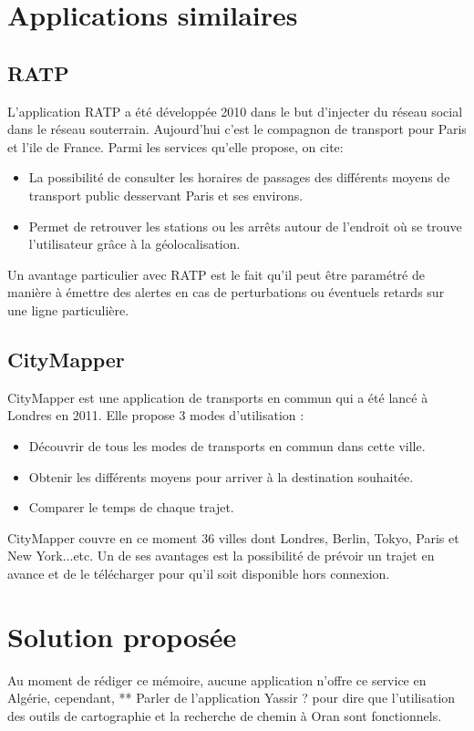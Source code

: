 \section{Applications similaires}			
\subsection{RATP}
L'application RATP a été développée 2010 dans le but d'injecter du réseau social dans le réseau souterrain. Aujourd'hui c'est le compagnon de transport pour Paris et l'ile de France.
Parmi les services qu'elle propose, on cite:
\begin{itemize}
	\item La possibilité de consulter les horaires de passages des différents moyens de transport public desservant Paris et ses environs. 
	\item Permet de retrouver les stations ou les arrêts autour de l'endroit où se trouve l'utilisateur grâce à la géolocalisation.
\end{itemize}
Un avantage particulier avec RATP est le fait qu'il peut être paramétré de manière à émettre des alertes en cas de perturbations ou éventuels retards sur une ligne particulière.
	
\subsection{CityMapper}
CityMapper est une application de transports en commun qui a été lancé à Londres en 2011.
Elle propose 3 modes d'utilisation : 
\begin{itemize}
	\item Découvrir de tous les modes de transports en commun dans cette ville.
	\item Obtenir les différents moyens pour arriver à la destination souhaitée.
	\item Comparer le temps de chaque trajet.
\end{itemize}

CityMapper couvre en ce moment 36 villes dont Londres, Berlin, Tokyo, Paris et New York...etc.  Un de ses avantages est la possibilité de prévoir un trajet en avance et de le télécharger pour qu'il soit disponible hors connexion.

\section{Solution proposée}
Au moment de rédiger ce mémoire, aucune application n'offre ce service en Algérie, cependant, ** Parler de l'application Yassir ? pour dire que l'utilisation des outils de cartographie et la recherche de chemin à Oran sont fonctionnels.
		
